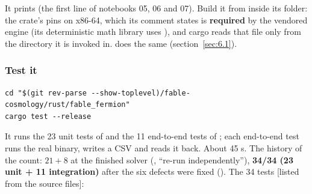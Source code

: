 It prints  (the first line of notebooks 05, 06 and 07). Build it from inside its folder: the crate's  pins  on x86-64, which its comment states is \textbf{required} by the vendored engine (its deterministic math library uses ), and cargo reads that file only from the directory it is invoked in.  does the same (section~\ref{sec:6.1}).

\subsubsection{Test it}
\label{sec:6.4.2}

\begin{Verbatim}
cd "$(git rev-parse --show-toplevel)/fable-cosmology/rust/fable_fermion"
cargo test --release
\end{Verbatim}

It runs the 23 unit tests of  and the 11 end-to-end tests of ; each end-to-end test runs the real binary, writes a CSV and reads it back. About 45 s. The history of the count: $21 + 8$ at the finished solver (, ``re-run independently''), \textbf{34/34 (23 unit + 11 integration)} after the six defects were fixed (). The 34 tests [listed from the source files]:


